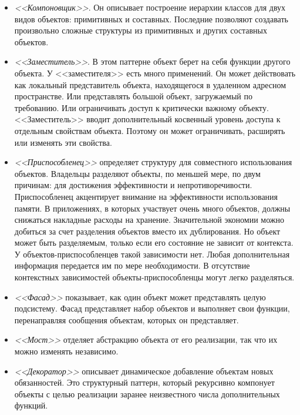 \begin{itemize}
\item
\textit{<<Компоновщик>>}. Он описывает построение иерархии классов для
двух видов объектов: примитивных и составных.
Последние позволяют создавать произвольно сложные структуры из примитивных и
других составных объектов.

\item
\textit{<<Заместитель>>}. В этом паттерне объект берет на себя функции другого объекта.
У <<заместителя>> есть много применений.
Он может действовать как локальный представитель объекта, находящегося в
удаленном адресном пространстве. Или представлять большой объект,
загружаемый по требованию. Или ограничивать доступ к критически важному
объекту. <<Заместитель>> вводит дополнительный косвенный уровень доступа к
отдельным свойствам объекта. Поэтому он может ограничивать, расширять или
изменять эти свойства.

\item
\textit{<<Приспособленец>>} определяет структуру для совместного использования объектов.
Владельцы разделяют объекты, по меньшей мере, по двум причинам: для достижения эффективности
и непротиворечивости. 
Приспособленец акцентирует внимание на эффективности использования памяти.
В приложениях, в которых участвует очень много объектов, должны снижаться накладные
расходы на хранение. Значительной экономии можно добиться за счет разделения
объектов вместо их дублирования. Но объект может быть разделяемым, только
если его состояние не зависит от контекста. У объектов-приспособленцев такой
зависимости нет. Любая дополнительная информация передается им по мере необходимости.
В отсутствие контекстных зависимостей объекты-приспособленцы могут легко разделяться.

\item
\textit{<<Фасад>>} показывает, как один объект может представлять целую
подсистему. Фасад представляет набор объектов и выполняет свои функции, перенаправляя
сообщения объектам, которых он представляет. 

\item
\textit{<<Мост>>} отделяет абстракцию объекта от его реализации,
так что их можно изменять независимо.

\item
\textit{<<Декоратор>>} описывает динамическое добавление объектам новых обязанностей.
Это структурный паттерн, который рекурсивно компонует объекты с целью реализации
заранее неизвестного числа дополнительных функций.

\end{itemize}

